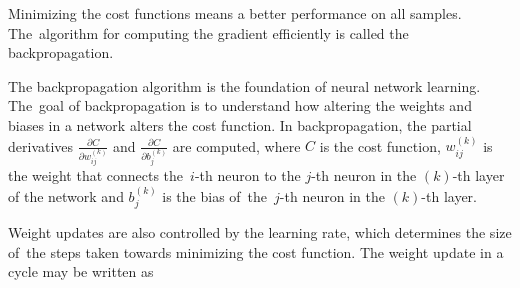 Minimizing the cost functions means a better performance on all samples. The~algorithm for computing the gradient efficiently is called the backpropagation.

The backpropagation algorithm is the foundation of neural network learning. The~goal of backpropagation is to understand how altering the weights and biases in a network alters the cost function.
In backpropagation, the partial derivatives $\frac{\partial C}{\partial w^{(k)}_{ij}}$ and $\frac{\partial C}{\partial b^{(k)}_j}$ are computed, where $C$ is the cost function, $w^{(k)}_{ij}$ is the weight that connects the~$i$-th neuron to the $j$-th neuron in the $(k)$-th layer of the network and $b^{(k)}_j$ is the bias of~the~$j$-th neuron in the $(k)$-th layer.

Weight updates are also controlled by the learning rate, which determines the size of~the steps taken towards minimizing the cost function. The weight update in a cycle may be written as
%		
